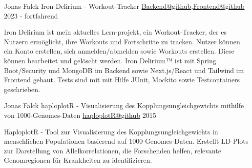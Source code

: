 \begin{cventries}
  \cventry
    {Jonas Falck} %
    {Iron Delirium - Workout‑Tracker} %
    {\href{https://github.com/joe-nas/workout-app}{Backend@github},\href{https://github.com/joe-nas/workout-app-frontend-next}{Frontend@github}} %
    {2023 - fortfahrend} %
    {
      \begin{cvitems} %
        \item {Iron Delirium ist mein aktuelles Lern-projekt, ein Workout‑Tracker, der es Nutzern ermöglicht, ihre Workouts und Fortschritte zu tracken. Nutzer
        können ein Konto erstellen, sich anmelden/abmelden sowie Workouts erstellen. Diese können bearbeitet und gelöscht werden. Iron Delirium™
        ist mit Spring Boot/Security und MongoDB im Backend sowie Next.js/React und Tailwind im Frontend gebaut. Tests sind mit mit Hilfe JUnit,
        Mockito sowie Testcontainers geschrieben.}
        \vspace{0.2cm}
        \newline{}   
            
         
      \end{cvitems}
    }

  \cventry
    {Jonas Falck} %
    {haploplotR - Visualisierung des Kopplungsungleichgewichts mithilfe von 1000-Genomes-Daten} %
    {\href{https://github.com/joe-nas/haploplotR}{haploplotR@github}} %
    {2015} %
    {
      \begin{cvitems} %
        \item {HaploplotR - Tool zur Visualisierung des Kopplungsungleichgewichts in menschlichen Populationen basierend auf 1000-Genomes-Daten. 
        Erstellt LD-Plots zur Darstellung von Allelkorrelationen, die Forschenden helfen, relevante Genomregionen für Krankheiten zu identifizieren.}
        \vspace{0.2cm}
        \newline{}   
      \end{cvitems}
    }
\end{cventries}
